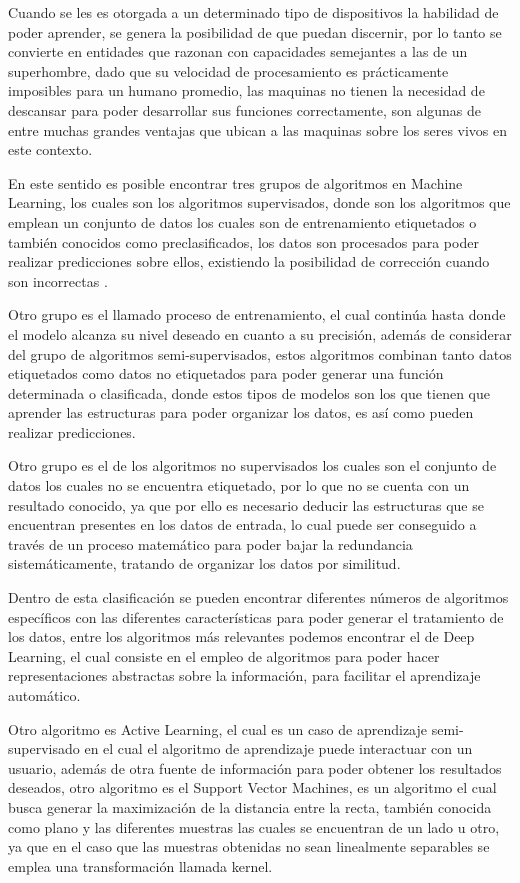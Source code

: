 Cuando se les es otorgada a un determinado tipo de dispositivos la habilidad de poder aprender, se genera la posibilidad de que puedan discernir, por lo tanto se convierte en entidades que razonan con capacidades semejantes a las de un superhombre, dado que su velocidad de procesamiento es prácticamente imposibles para un humano promedio, las maquinas no tienen la necesidad de descansar para poder desarrollar sus funciones correctamente, son algunas de entre muchas grandes ventajas que ubican a las maquinas sobre los seres vivos en este contexto.

En este sentido es posible encontrar tres grupos de algoritmos en Machine Learning, los cuales son los algoritmos supervisados, donde son los algoritmos que emplean un conjunto de datos los cuales son de entrenamiento etiquetados o también conocidos como preclasificados, los datos son procesados para poder realizar predicciones sobre ellos, existiendo la posibilidad de corrección cuando son incorrectas \cite{RussoC2016}. 

Otro grupo es el llamado proceso de entrenamiento, el cual continúa hasta donde el modelo alcanza su nivel deseado en cuanto a su precisión, además de considerar del grupo de algoritmos semi-supervisados, estos algoritmos combinan tanto datos etiquetados como datos no etiquetados para poder generar una función determinada o clasificada, donde estos tipos de modelos son los que tienen que aprender las estructuras para poder organizar los datos, es así como pueden realizar predicciones.

Otro grupo es el de los algoritmos no supervisados los cuales son el conjunto de datos los cuales no se encuentra etiquetado, por lo que no se cuenta con un resultado conocido, ya que por ello es necesario deducir las estructuras que se encuentran presentes en los datos de entrada, lo cual puede ser conseguido a través de un proceso matemático para poder bajar la redundancia sistemáticamente, tratando de organizar los datos por similitud.

Dentro de esta clasificación se pueden encontrar diferentes números de algoritmos específicos con las diferentes características para poder generar el tratamiento de los datos, entre los algoritmos más relevantes podemos encontrar el de Deep Learning, el cual consiste en el empleo de algoritmos para poder hacer representaciones abstractas sobre la información, para facilitar el aprendizaje automático.

Otro algoritmo es Active Learning, el cual es un caso de aprendizaje semi-supervisado en el cual el algoritmo de aprendizaje puede interactuar con un usuario, además de otra fuente de información para poder obtener los resultados deseados, otro algoritmo es el Support Vector Machines, es un algoritmo el cual busca generar la maximización de la distancia entre la recta, también conocida como plano y las diferentes muestras las cuales se encuentran de un lado u otro, ya que en el caso que las muestras obtenidas no sean linealmente separables se emplea una transformación llamada kernel.

